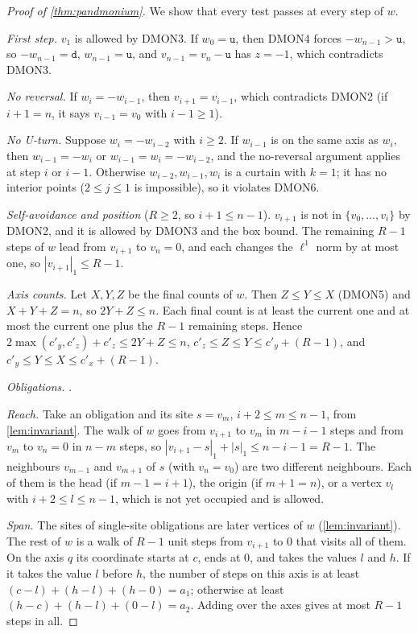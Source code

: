 \documentclass[11pt]{article}
\theoremstyle{plain}
\theoremstyle{definition}
\theoremstyle{remark}
\newcommand{\word}[1]{\texttt{#1}}
\newcommand{\dmon}[1]{\textup{DMON#1}}
\begin{document}
\begin{proof}[Proof of \cref{thm:pandmonium}]
We show that every test passes at every step of $w$.

\emph{First step.} $v_1$ is allowed by \dmon3. If $w_0=\word{u}$, then \dmon4 forces $-w_{n-1}>\word{u}$,
so $-w_{n-1}=\word{d}$, $w_{n-1}=\word{u}$, and $v_{n-1}=v_n-\word{u}$ has $z=-1$, which contradicts
\dmon3.

\emph{No reversal.} If $w_i=-w_{i-1}$, then $v_{i+1}=v_{i-1}$, which contradicts \dmon2 (if $i+1=n$,
it says $v_{i-1}=v_0$ with $i-1\ge1$).

\emph{No U-turn.} Suppose $w_i=-w_{i-2}$ with $i\ge2$. If $w_{i-1}$ is on the same axis as $w_i$, then
$w_{i-1}=-w_i$ or $w_{i-1}=w_i=-w_{i-2}$, and the no-reversal argument applies at step $i$ or $i-1$.
Otherwise $w_{i-2},w_{i-1},w_i$ is a curtain with $k=1$; it has no interior points ($2\le j\le1$ is
impossible), so it violates \dmon6.

\emph{Self-avoidance and position} ($R\ge2$, so $i+1\le n-1$). $v_{i+1}$ is not in
$\{v_0,\dots,v_i\}$ by \dmon2, and it is allowed by \dmon3 and the box bound. The remaining $R-1$
steps of $w$ lead from $v_{i+1}$ to $v_n=0$, and each changes the $\ell^1$ norm by at most one, so
$|v_{i+1}|_1\le R-1$.

\emph{Axis counts.} Let $X,Y,Z$ be the final counts of $w$. Then $Z\le Y\le X$ (\dmon5) and
$X+Y+Z=n$, so $2Y+Z\le n$. Each final count is at least the current one and at most the current one
plus the $R-1$ remaining steps. Hence $2\max(c'_y,c'_z)+c'_z\le 2Y+Z\le n$, $c'_z\le Z\le Y\le
c'_y+(R-1)$, and $c'_y\le Y\le X\le c'_x+(R-1)$.

\emph{Obligations.} .

\emph{Reach.} Take an obligation and its site $s=v_m$, $i+2\le m\le n-1$, from \cref{lem:invariant}.
The walk of $w$ goes from $v_{i+1}$ to $v_m$ in $m-i-1$ steps and from $v_m$ to $v_n=0$ in $n-m$ steps,
so $|v_{i+1}-s|_1+|s|_1\le n-i-1=R-1$. The neighbours $v_{m-1}$ and $v_{m+1}$ of $s$ (with
$v_n=v_0$) are two different neighbours. Each of them is the head (if $m-1=i+1$), the origin (if
$m+1=n$), or a vertex $v_l$ with $i+2\le l\le n-1$, which is not yet occupied and is allowed.

\emph{Span.} The sites of single-site obligations are later vertices of $w$ (\cref{lem:invariant}).
The rest of $w$ is a walk of $R-1$ unit steps from $v_{i+1}$ to $0$ that visits all of them. On the
axis $q$ its coordinate starts at $c$, ends at $0$, and takes the values $l$ and $h$. If it takes the
value $l$ before $h$, the number of steps on this axis is at least $(c-l)+(h-l)+(h-0)=a_1$; otherwise
at least $(h-c)+(h-l)+(0-l)=a_2$. Adding over the axes gives at most $R-1$ steps in all.


\end{proof}
\end{document}
